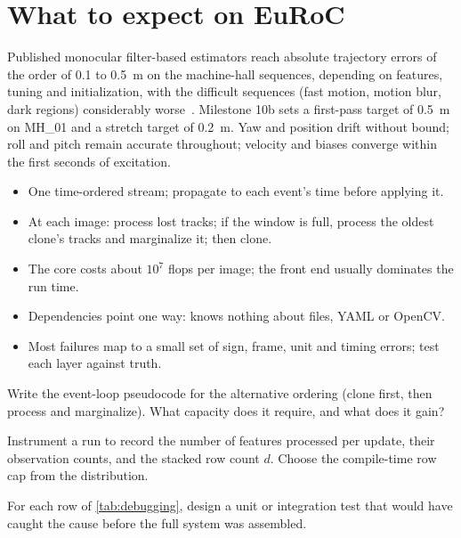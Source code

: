 \section{What to expect on EuRoC}

Published monocular filter-based estimators reach absolute trajectory errors of the order of 0.1 to 0.5~m on the machine-hall
sequences, depending on features, tuning and initialization, with the difficult sequences (fast motion, motion blur, dark
regions) considerably worse~\cite{delmerico2018benchmark}. Milestone 10b sets a first-pass target of 0.5~m on MH\_01 and a stretch target of
0.2~m. Yaw and position drift without bound; roll and pitch remain accurate throughout; velocity and biases converge within the
first seconds of excitation.

\begin{takeaways}
\begin{itemize}
  \item One time-ordered stream; propagate to each event's time before applying it.
  \item At each image: process lost tracks; if the window is full, process the oldest clone's tracks and marginalize it; then clone.
  \item The core costs about $10^7$ flops per image; the front end usually dominates the run time.
  \item Dependencies point one way:  knows nothing about files, YAML or OpenCV.
  \item Most failures map to a small set of sign, frame, unit and timing errors; test each layer against truth.
\end{itemize}
\end{takeaways}

\begin{exercises}
  \item Write the event-loop pseudocode for the alternative ordering (clone first, then process and marginalize). What capacity
        does it require, and what does it gain?
  \item Instrument a run to record the number of features processed per update, their observation counts, and the stacked row
        count $d$. Choose the compile-time row cap from the distribution.
  \item For each row of \cref{tab:debugging}, design a unit or integration test that would have caught the cause before the full
        system was assembled.
\end{exercises}
